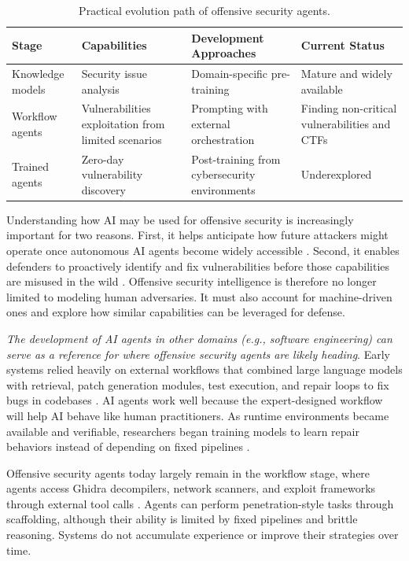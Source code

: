 \documentclass{article}
\theoremstyle{plain}
\theoremstyle{definition}
\theoremstyle{remark}
\begin{document}
\begin{table}[t]
\centering
\caption{Practical evolution path of offensive security agents.}
\label{tab:agent-stages}
\small
\setlength\tabcolsep{5pt}
\def\arraystretch{1.15}
\begin{tabular}{p{2.6cm} p{4.2cm} p{4.2cm} p{4.2cm}}
\toprule
    \textbf{Stage} & \textbf{Capabilities} & \textbf{Development Approaches} & \textbf{Current Status} \\
\midrule
Knowledge models & Security issue analysis & Domain-specific pre-training & Mature and widely available  \\
Workflow agents & Vulnerabilities exploitation from limited scenarios & Prompting with external orchestration & Finding non-critical vulnerabilities and CTFs  \\
Trained agents & Zero-day vulnerability discovery   & Post-training from cybersecurity environments & Underexplored \\
\bottomrule
\end{tabular}
\end{table}


Understanding how AI may be used for offensive security is increasingly important for two reasons. First, it helps anticipate how future attackers might operate once autonomous AI agents become widely accessible \citep{wallace2025estimating}. Second, it enables defenders to proactively identify and fix vulnerabilities before those capabilities are misused in the wild \citep{wang2025cybergym}. Offensive security intelligence is therefore no longer limited to modeling human adversaries. It must also account for machine-driven ones and explore how similar capabilities can be leveraged for defense.

\textit{The development of AI agents in other domains (e.g., software engineering) can serve as a reference for where offensive security agents are likely heading}. Early systems relied heavily on external workflows that combined large language models with retrieval, patch generation modules, test execution, and repair loops to fix bugs in codebases \citep{yang2024swe,wang2024openhands}. AI agents work well because the expert-designed workflow will help AI behave like human practitioners. As runtime environments became available and verifiable, researchers began training models to learn repair behaviors instead of depending on fixed pipelines \citep{pantraining,wei2025swerl}.



Offensive security agents today largely remain in the workflow stage, where agents access Ghidra decompilers, network scanners, and exploit frameworks through external tool calls \citep{deng2024pentestgpt,abramovichenigma}. Agents can perform penetration-style tasks through scaffolding, although their ability is limited by fixed pipelines and brittle reasoning. Systems do not accumulate experience or improve their strategies over time.
\end{document}
